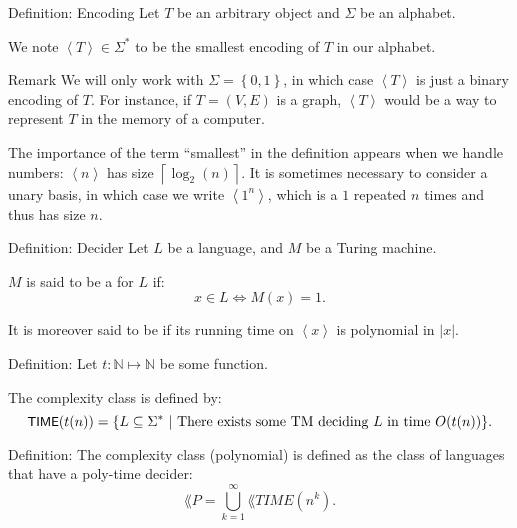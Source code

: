\documentclass[a4paper]{article}
\begin{document}
\begin{parag}{Definition: Encoding}
    Let $T$ be an arbitrary object and $\Sigma$ be an alphabet. 

    We note $\left\langle T \right\rangle \in \Sigma^*$ to be the smallest encoding of $T$ in our alphabet.

    \begin{subparag}{Remark}
        We will only work with $\Sigma = \left\{0, 1\right\}$, in which case $\left\langle T \right\rangle$ is just a binary encoding of $T$. For instance, if $T = \left(V, E\right)$ is a graph, $\left\langle T \right\rangle$ would be a way to represent $T$ in the memory of a computer.

        The importance of the term ``smallest'' in the definition appears when we handle numbers: $\left\langle n \right\rangle$ has size $\left\lceil \log_2\left(n\right) \right\rceil $. It is sometimes necessary to consider a unary basis, in which case we write $\left\langle 1^n \right\rangle$, which is a $1$ repeated $n$ times and thus has size $n$.
    \end{subparag}
\end{parag}

\begin{parag}{Definition: Decider}
    Let $L$ be a language, and $M$ be a Turing machine.

    $M$ is said to be a  for $L$ if: 
    \[x \in L \iff M\left(x\right) = 1.\]

    It is moreover said to be  if its running time on $\left\langle x \right\rangle$ is polynomial in $\left|x\right|$. 
\end{parag}

\begin{parag}{Definition: }
    Let $t: \mathbb{N} \mapsto \mathbb{N}$ be some function. 

    The  complexity class is defined by: 
    \[\lang{TIME}\left(t\left(n\right)\right) = \left\{L \subseteq \Sigma^* \suchthat \text{There exists some TM deciding $L$ in time $O\left(t\left(n\right)\right)$}\right\}.\]
\end{parag}

\begin{parag}{Definition: }
    The complexity class  (polynomial) is defined as the class of languages that have a poly-time decider:
    \[\lang{P} = \bigcup_{k=1}^{\infty} \lang{TIME}\left(n^k\right).\]
\end{parag}
\end{document}
